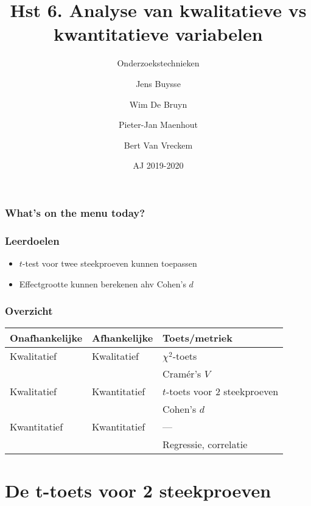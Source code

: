 \documentclass[aspectratio=169]{beamer}
\title{Hst 6. Analyse van kwalitatieve vs kwantitatieve variabelen}
\subtitle{Onderzoekstechnieken}
\author{Jens Buysse \and Wim {De Bruyn} \and Pieter-Jan Maenhout \and Bert {Van Vreckem}}
\date{AJ 2019-2020}
\begin{document}
\begin{frame}
  \maketitle
\end{frame}

\begin{frame}
  \frametitle{What's on the menu today?}
  
  \tableofcontents
\end{frame}

\begin{frame}
  \frametitle{Leerdoelen}
  
  \begin{itemize}
    \item $t$-test voor twee steekproeven kunnen toepassen
    \item Effectgrootte kunnen berekenen ahv Cohen's $d$
  \end{itemize}
\end{frame}

\begin{frame}
  \frametitle{Overzicht}
  \centering
  \begin{tabular}{lll}
    \toprule
    \textbf{Onafhankelijke} & \textbf{Afhankelijke} & \textbf{Toets/metriek}        \\
    \midrule
    Kwalitatief             & Kwalitatief           & $\chi^2$-toets                \\
    &                       & Cramér's $V$                  \\
    Kwalitatief             & Kwantitatief          & $t$-toets voor 2 steekproeven \\
    &                       & Cohen's $d$                   \\
    Kwantitatief            & Kwantitatief          & ---                           \\
    &                       & Regressie, correlatie         \\
    \bottomrule
  \end{tabular}
\end{frame}

\section{De t-toets voor 2 steekproeven}
\end{document}

